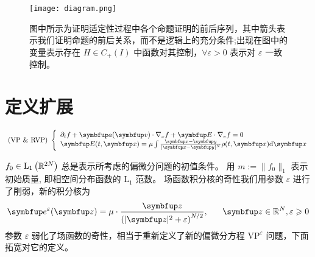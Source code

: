 

\begin{figure}[h]
    \centering
    \texttt{[image: diagram.png]}
    \caption{图中所示为证明适定性过程中各个命题证明的前后序列，其中箭头表示我们证明命题的前后关系，而不是逻辑上的充分条件;出现在图中的变量表示存在 $H\in C_+(I)$ 中函数对其控制，$\forall \varepsilon>0$ 表示对 $\varepsilon$ 一致控制。}
    \label{fig:diagram}
\end{figure}


\section{定义扩展}
\begin{equation}
    \label{eq:vp_ndim}
    \text { (VP \& RVP) }\left\{\begin{array}{l}
    \partial_{t} f+\vect{a}(\vv ) \cdot \nabla_{x} f+\vE \cdot \nabla_{v} f=0 \\
    \vE(t, \vx)=\mu\int \frac{\vx - \vect{y}}{|\vx - \vect{y}|^N} \rho(t,\vx) \mathrm{d} \vx %
\end{array}\right.\end{equation}


 $f_{0} \in \mathrm{L}_{1}\left({\mathbb{R}}^{2 N}\right)$ 总是表示所考虑的偏微分问题的初值条件。 用 $m:=\|f_{0}\|_{1}$ 表示初始质量, 即相空间分布函数的 $\mathrm{L}_1$ 范数。
场函数积分核的奇性我们用参数 $\varepsilon$ 进行了削弱，新的积分核为
$$\vect{e}^{\varepsilon}(\vect{z})=\mu \cdot \frac{\vect{z}}{\left(|\vect{z}|^{2}+\varepsilon\right)^{N / 2}},~ \quad ~ \vect{z} \in \bbR^{N}, \varepsilon \geqslant 0$$
参数 $\varepsilon$ 弱化了场函数的奇性，相当于重新定义了新的偏微分方程 $\text{VP}^\varepsilon$ 问题，下面拓宽对它的定义。

